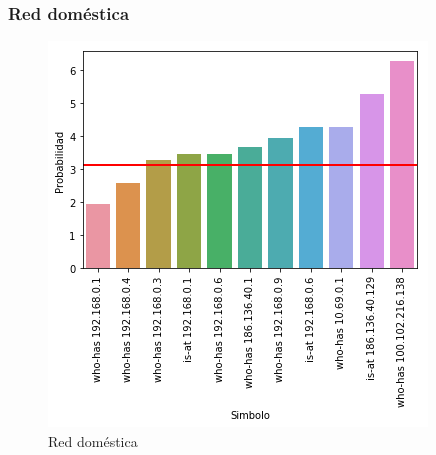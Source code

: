 \subsubsection{Red doméstica}

\begin{figure}[H]
	\centering
	\includegraphics[width=.5\linewidth]{imagenes/manu_casa_hosts}
	\caption{Red doméstica}
\end{figure}

